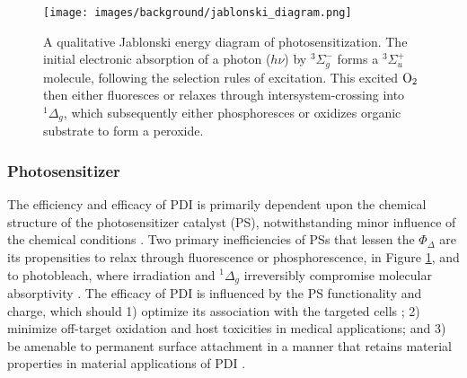\begin{figure}[t]
    \centering
    \texttt{[image: images/background/jablonski\_diagram.png]}
    \caption{
        A qualitative Jablonski energy diagram of photosensitization. The initial electronic absorption of a photon ($h\nu$) by $^3\Sigma_g^-$ forms a $^3\Sigma_u^+$ molecule, following the selection rules of excitation. This excited $\ce{O2}$ then either fluoresces or relaxes through intersystem-crossing into $^1\Delta_g$, which subsequently either phosphoresces or oxidizes organic substrate to form a peroxide.
    }
    \label{jablonski_diagram}
\end{figure}

\subsubsection{Photosensitizer}
The efficiency and efficacy of PDI is primarily dependent upon the chemical structure of the photosensitizer catalyst (PS), notwithstanding minor influence of the chemical conditions \cite{Kruk1998PhotophysicsLuminescence,Kullmann2012UltrafastBisporphyrin}. Two primary inefficiencies of PSs that lessen the $\Phi_{\Delta}$ are its propensities to relax through fluorescence or phosphorescence, in Figure \ref{jablonski_diagram}, and to photobleach, where irradiation and $^1\Delta_g$ irreversibly compromise molecular absorptivity \cite{Bonnett2010ChemInformTherapy,Wasser1973TheMetallochlorins}. The efficacy of PDI is influenced by the PS functionality and charge, which should 1) optimize its association with the targeted cells \cite{VanDerWal1997DeterminationBacteria,Dickson1989CellSurfaces}; 2) minimize off-target oxidation \cite{Lambrechts2005PhotodynamicMice} and host toxicities \cite{Quishida2016PhotodynamicLight} in medical applications; and 3) be amenable to permanent surface attachment in a manner that retains material properties \cite{McCoy2014PhotodynamicControl} in material applications of PDI \cite{Peddinti2018PhotodynamicThreat,Gottenbos2001AntimicrobialBacteria}. 

